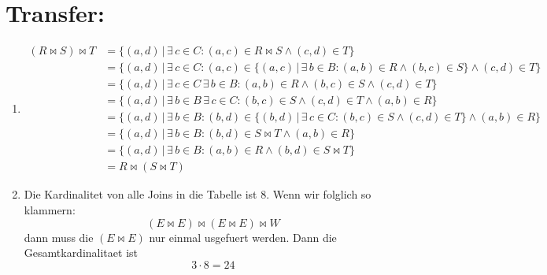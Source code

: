     \section*{Transfer:}
    \begin{enumerate}[label=(\alph*)]
    	\item
        \begin{align*}
            (R \Join S) \Join T &= \{(a,d) \, | \, \exists\, c \in C : (a,c) \in R \Join S \land (c,d) \in T \}\\
            &=\{(a,d) \, | \, \exists\, c \in C : (a,c) \in \{(a,c) \,|\, \exists\, b \in B : (a,b) \in R \land (b,c) 
            \in S \}  \land (c,d) \in T \}\\
            &=\{(a,d) \, | \, \exists\, c \in C \, \exists\, b \in B : (a,b) \in R \land (b,c) \in S   \land (c,d) \in T \}\\
            &=\{(a,d) \, |  \, \exists\, b \in B \, \exists\, c \in C :  (b,c) \in S   \land (c,d) \in T \land (a,b) 
            \in R  \}\\
            &=\{(a,d) \, |  \, \exists\, b \in B : (b,d) \in \{(b,d) \,|\, \exists\, c \in C :  (b,c) \in S   
            \land (c,d) \in T\} \land (a,b) \in R  \}\\
            &=\{(a,d) \, |  \, \exists\, b \in B : (b,d) \in S\Join T \land (a,b) \in R  \}\\
            &=\{(a,d) \, |  \, \exists\, b \in B : (a,b) \in R \land (b,d) \in S\Join T  \}\\
            &=R \Join (S \Join T)
        \end{align*}
        \item
        Die Kardinalitet von alle Joins in die Tabelle ist 8. Wenn wir folglich so klammern:
        $$  (E \Join E) \Join (E \Join E) \Join W$$
        dann muss die $(E \Join E)$ nur einmal usgefuert werden. Dann die Gesamtkardinalitaet ist 
        $$3\cdot 8 = 24$$
    \end{enumerate}







